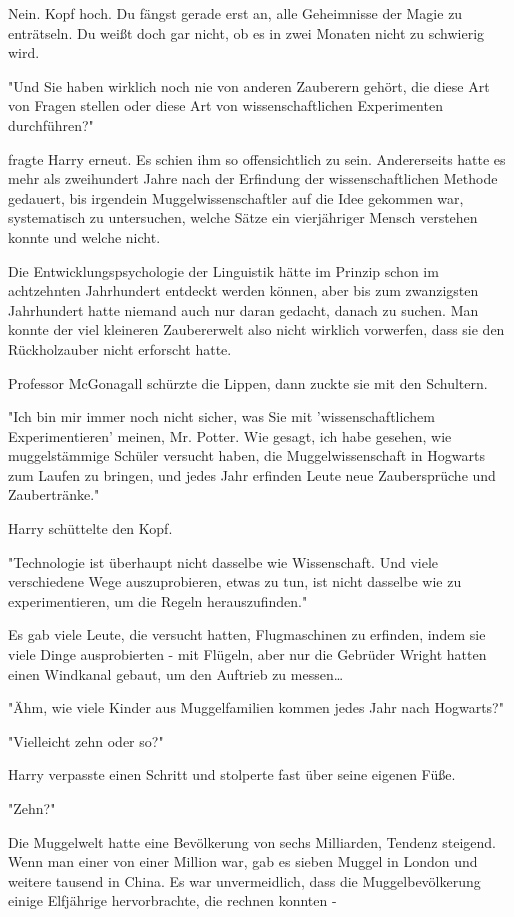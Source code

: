 {Nein. Kopf hoch. Du fängst gerade erst an, alle Geheimnisse der Magie zu enträtseln. Du weißt doch gar nicht, ob es in zwei Monaten nicht zu schwierig wird.

"Und Sie haben wirklich noch nie von anderen Zauberern gehört, die diese Art von Fragen stellen oder diese Art von wissenschaftlichen Experimenten durchführen?"

fragte Harry erneut. Es schien ihm so offensichtlich zu sein. Andererseits hatte es mehr als zweihundert Jahre nach der Erfindung der wissenschaftlichen Methode gedauert, bis irgendein Muggelwissenschaftler auf die Idee gekommen war, systematisch zu untersuchen, welche Sätze ein vierjähriger Mensch verstehen konnte und welche nicht.

Die Entwicklungspsychologie der Linguistik hätte im Prinzip schon im achtzehnten Jahrhundert entdeckt werden können, aber bis zum zwanzigsten Jahrhundert hatte niemand auch nur daran gedacht, danach zu suchen. Man konnte der viel kleineren Zaubererwelt also nicht wirklich vorwerfen, dass sie den Rückholzauber nicht erforscht hatte.

Professor McGonagall schürzte die Lippen, dann zuckte sie mit den Schultern.

"Ich bin mir immer noch nicht sicher, was Sie mit 'wissenschaftlichem Experimentieren' meinen, Mr. Potter. Wie gesagt, ich habe gesehen, wie muggelstämmige Schüler versucht haben, die Muggelwissenschaft in Hogwarts zum Laufen zu bringen, und jedes Jahr erfinden Leute neue Zaubersprüche und Zaubertränke."

Harry schüttelte den Kopf.

"Technologie ist überhaupt nicht dasselbe wie Wissenschaft. Und viele verschiedene Wege auszuprobieren, etwas zu tun, ist nicht dasselbe wie zu experimentieren, um die Regeln herauszufinden."

Es gab viele Leute, die versucht hatten, Flugmaschinen zu erfinden, indem sie viele Dinge ausprobierten - mit Flügeln, aber nur die Gebrüder Wright hatten einen Windkanal gebaut, um den Auftrieb zu messen…

"Ähm, wie viele Kinder aus Muggelfamilien kommen jedes Jahr nach Hogwarts?"

"Vielleicht zehn oder so?"

Harry verpasste einen Schritt und stolperte fast über seine eigenen Füße.

"Zehn?"

Die Muggelwelt hatte eine Bevölkerung von sechs Milliarden, Tendenz steigend. Wenn man einer von einer Million war, gab es sieben Muggel in London und weitere tausend in China. Es war unvermeidlich, dass die Muggelbevölkerung einige Elfjährige hervorbrachte, die rechnen konnten -

}
